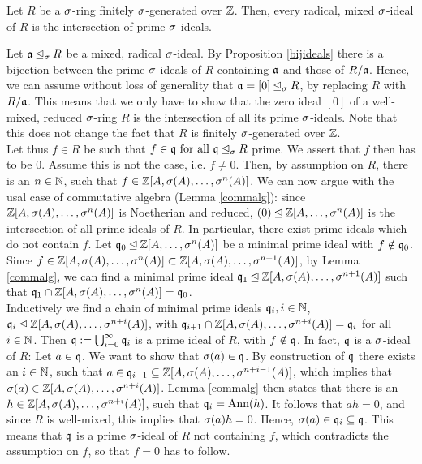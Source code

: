 \begin{prop}\label{mixedintersectionprimesfinite}
Let $R$ be a $\sigma$-ring finitely $\sigma$-generated over $\mathbb{Z}$. Then, every radical, mixed $\sigma$-ideal of $R$ is the intersection of prime $\sigma$-ideals.
\begin{bew}
Let $\mathfrak{a} \unlhd_{\sigma} R$ be a mixed, radical $\sigma$-ideal. By Proposition \ref{bijideals} there is a bijection between the prime $\sigma$-ideals of $R$ containing $\mathfrak{a}$ and those of $R/\mathfrak{a}$. Hence, we can assume without loss of generality that $\mathfrak{a} = [0] \unlhd_{\sigma} R$,
 by replacing $R$ with $R/\mathfrak{a}$. This means that we only have to show that the zero ideal $[0]$ of a well-mixed, reduced $\sigma$-ring $R$ is the intersection of all its prime $\sigma$-ideals. Note that this does not change the fact
that $R$ is finitely $\sigma$-generated over $\mathbb{Z}$. \\

\indent Let thus $f \in R$ be such that $f \in \mathfrak{q} \text{ for all } \mathfrak{q} \unlhd_{\sigma} R$ prime. We assert that $f$ then has to be $0$. Assume this is not the case, i.e. $f \neq 0$. Then, by assumption on $R$, there is an $n \in \mathbb{N}$, such that $f \in \mathbb{Z}[A,\sigma(A),\ldots,\sigma^n(A)]$.
We can now argue with the usal case of commutative algebra (Lemma \ref{commalg}): since $\mathbb{Z}[A,\sigma(A),\ldots,\sigma^n(A)]$ is Noetherian and reduced, $(0) \unlhd \mathbb{Z}[A,\ldots,\sigma^n(A)]$ is the intersection of all prime ideals of $R$. In particular, there exist prime ideals which do not contain $f$.
Let $\mathfrak{q}_0 \unlhd \mathbb{Z}[A,\ldots,\sigma^n(A)]$ be a minimal prime ideal with $f \notin \mathfrak{q}_0$. Since $f \in \mathbb{Z}[A,\sigma(A),\ldots,\sigma^n(A)] \subset \mathbb{Z}[A,\sigma(A),\ldots,\sigma^{n+1}(A)]$, by Lemma \ref{commalg}, we can find a minimal prime ideal $\mathfrak{q}_1 \unlhd \mathbb{Z}[A,\sigma(A),\ldots,\sigma^{n+1}(A)]$
such that $\mathfrak{q}_1 \cap \mathbb{Z}[A,\sigma(A),\ldots,\sigma^{n}(A)] = \mathfrak{q}_0$. \\

\indent Inductively we find a chain of minimal prime ideals $\mathfrak{q}_i, i \in \mathbb{N}$, $\mathfrak{q}_i \unlhd \mathbb{Z}[A,\sigma(A),\ldots,\sigma^{n+i}(A)]$, with $\mathfrak{q}_{i+1} \cap \mathbb{Z}[A,\sigma(A),\ldots,\sigma^{n+i}(A)] = \mathfrak{q}_i$ for all $i \in \mathbb{N}$.
Then $\mathfrak{q} := \bigcup_{i=0}^{\infty} \mathfrak{q}_i$ is a prime ideal of $R$, with $f \notin \mathfrak{q}$. In fact, $\mathfrak{q}$ is a $\sigma$-ideal of $R$: Let $a \in \mathfrak{q}$. We want to show that $\sigma(a) \in \mathfrak{q}$. By construction of $\mathfrak{q}$ there exists an $i \in \mathbb{N}$, such
that $a \in \mathfrak{q}_{i-1} \subseteq \mathbb{Z}[A,\sigma(A),\ldots,\sigma^{n+i-1}(A)]$, which implies that $\sigma(a) \in \mathbb{Z}[A,\sigma(A),\ldots,\sigma^{n+i}(A)]$. Lemma \ref{commalg} then states that there is an $h \in \mathbb{Z}[A,\sigma(A),\ldots,\sigma^{n+i}(A)]$, such that $ \mathfrak{q}_i = \text{Ann}(h)$.
It follows that $ah = 0$, and since $R$ is well-mixed, this implies that $\sigma(a)h = 0$. Hence, $\sigma(a) \in \mathfrak{q}_i \subseteq \mathfrak{q}$. This means that $\mathfrak{q}$ is a prime $\sigma$-ideal of $R$ not containing $f$, which contradicts the assumption on $f$, so that $f = 0$ has to follow.
\end{bew}
\end{prop}

